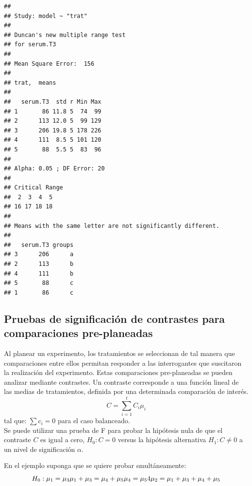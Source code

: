 \documentclass[]{book}
\begin{document}
\begin{verbatim}
## 
## Study: model ~ "trat"
## 
## Duncan's new multiple range test
## for serum.T3 
## 
## Mean Square Error:  156 
## 
## trat,  means
## 
##   serum.T3  std r Min Max
## 1       86 11.8 5  74  99
## 2      113 12.0 5  99 129
## 3      206 19.8 5 178 226
## 4      111  8.5 5 101 120
## 5       88  5.5 5  83  96
## 
## Alpha: 0.05 ; DF Error: 20 
## 
## Critical Range
##  2  3  4  5 
## 16 17 18 18 
## 
## Means with the same letter are not significantly different.
## 
##   serum.T3 groups
## 3      206      a
## 2      113      b
## 4      111      b
## 5       88      c
## 1       86      c
\end{verbatim}

\subsection{Pruebas de significación de contrastes para comparaciones
pre-planeadas}\label{pruebas-de-significacion-de-contrastes-para-comparaciones-pre-planeadas}

Al planear un experimento, los tratamientos se seleccionan de tal manera
que comparaciones entre ellos permitan responder a las interrogantes que
suscitaron la realización del experimento. Estas comparaciones
pre-planeadas se pueden analizar mediante contrastes. Un contraste
corresponde a una función lineal de las medias de tratamientos, definida
por una determinada comparación de interés.
\[C=\sum_{i=1}^{t}{C_i\mu_i}\] tal que: \(\sum{c_i=0}\) para el caso
balanceado.\\
Se puede utilizar una prueba de F para probar la hipótesis nula de que
el contraste \(C\) es igual a cero, \(H_0: C = 0\) versus la hipótesis
alternativa \(H_1:C\neq0\) a un nivel de significación \(\alpha\).

En el ejemplo suponga que se quiere probar smultáneamente:\\
\[H_0:\mu_1=\mu_3
\\ \mu_1+\mu_3 =\mu_4+\mu_5
\\ \mu_4=\mu_5
\\ 4\mu_2=\mu_1+\mu_3+\mu_4+\mu_5\]
\end{document}
